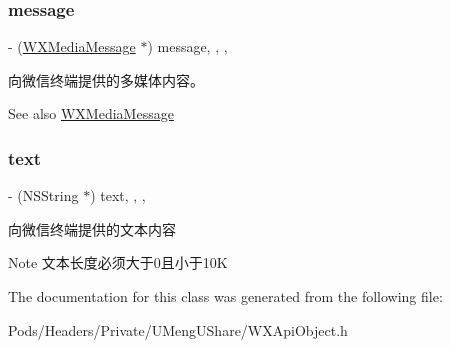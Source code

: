 \subsubsection{\texorpdfstring{message}{message}}
{\footnotesize\ttfamily -\/ (\mbox{\hyperlink{interface_w_x_media_message}{W\+X\+Media\+Message}} $\ast$) message\hspace{0.3cm}{\ttfamily [read]}, {\ttfamily [write]}, {\ttfamily [nonatomic]}, {\ttfamily [retain]}}

向微信终端提供的多媒体内容。 \begin{DoxySeeAlso}{See also}
\mbox{\hyperlink{interface_w_x_media_message}{W\+X\+Media\+Message}} 
\end{DoxySeeAlso}
\mbox{\label{interface_get_message_from_w_x_resp_a25c60eb5909d36838b598cff5324b51b}} 
\subsubsection{\texorpdfstring{text}{text}}
{\footnotesize\ttfamily -\/ (N\+S\+String $\ast$) text\hspace{0.3cm}{\ttfamily [read]}, {\ttfamily [write]}, {\ttfamily [nonatomic]}, {\ttfamily [retain]}}

向微信终端提供的文本内容 \begin{DoxyNote}{Note}
文本长度必须大于0且小于10K 
\end{DoxyNote}


The documentation for this class was generated from the following file\+:\begin{DoxyCompactItemize}
\item 
Pods/\+Headers/\+Private/\+U\+Meng\+U\+Share/W\+X\+Api\+Object.\+h\end{DoxyCompactItemize}
